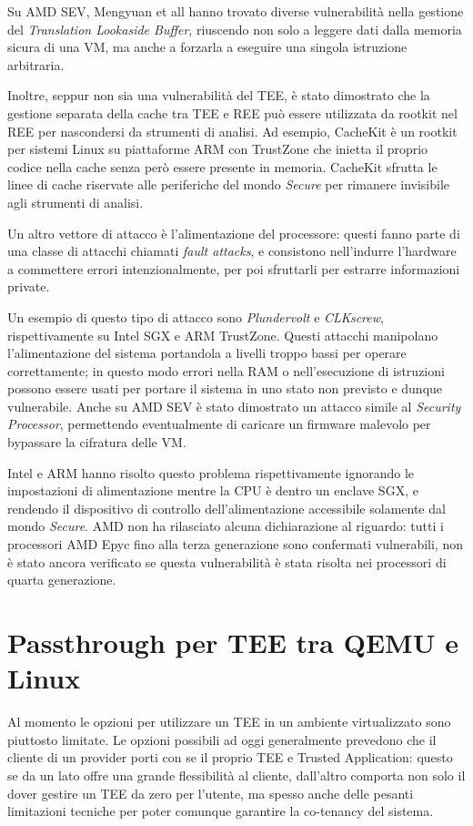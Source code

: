 \documentclass[12pt,italian]{report}
\begin{document}
Su AMD SEV, Mengyuan et all\cite{sev_tlb_poisoning} hanno trovato diverse
vulnerabilità nella gestione del \textit{Translation Lookaside Buffer},
riuscendo non solo a leggere dati dalla memoria sicura di una VM, ma anche
a forzarla a eseguire una singola istruzione arbitraria.

Inoltre, seppur non sia una vulnerabilità del TEE, è stato
dimostrato che la gestione separata della cache tra TEE e REE
può essere utilizzata da rootkit nel REE per nascondersi da strumenti
di analisi.
Ad esempio, CacheKit\cite{cachekit} è un rootkit per sistemi Linux
su piattaforme ARM con TrustZone che inietta il proprio codice nella
cache senza però essere presente in memoria.
CacheKit sfrutta le linee di cache riservate alle periferiche
del mondo \textit{Secure} per rimanere invisibile agli strumenti
di analisi. 

\bigbreak
Un altro vettore di attacco è l'alimentazione del processore: questi
fanno parte di una classe di attacchi chiamati \textit{fault attacks},
e consistono nell'indurre l'hardware a commettere errori intenzionalmente,
per poi sfruttarli per estrarre informazioni private.

Un esempio di questo tipo di attacco sono
\textit{Plundervolt}\cite{plundervolt} e
\textit{CLKscrew}\cite{clkscrew},
rispettivamente su Intel SGX e ARM TrustZone.
Questi attacchi manipolano l'alimentazione del sistema portandola a livelli
troppo bassi per operare correttamente; in questo modo errori nella RAM
o nell'esecuzione di istruzioni possono essere usati per portare il sistema
in uno stato non previsto e dunque vulnerabile.
Anche su AMD SEV è stato dimostrato un attacco simile\cite{sev_power_attack}
al \textit{Security Processor}, permettendo eventualmente di caricare un
firmware malevolo per bypassare la cifratura delle VM.

Intel e ARM hanno risolto questo problema rispettivamente ignorando le
impostazioni di alimentazione mentre la CPU è dentro un enclave SGX, e
rendendo il dispositivo di controllo dell'alimentazione accessibile
solamente dal mondo \textit{Secure}.
AMD non ha rilasciato alcuna dichiarazione al riguardo: tutti i processori
AMD Epyc fino alla terza generazione sono confermati vulnerabili, non è
stato ancora verificato se questa vulnerabilità è stata risolta nei
processori di quarta generazione.

\chapter{Passthrough per TEE tra QEMU e Linux}
\label{chap:passthrough-tee-qemu-linux}
Al momento le opzioni per utilizzare un TEE in un ambiente virtualizzato
sono piuttosto limitate.
Le opzioni possibili ad oggi generalmente prevedono che il cliente di un
provider porti con se il proprio TEE e Trusted Application:
questo se da un lato offre una grande flessibilità al cliente, dall'altro
comporta non solo il dover gestire un TEE da zero per l'utente, ma spesso
anche delle pesanti limitazioni tecniche per poter comunque garantire la
co-tenancy del sistema.
\end{document}
